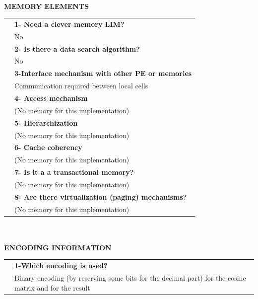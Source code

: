 \newpage{\large \textbf{\qquad }}\vspace{10pt}\\
{\large \textbf{MEMORY ELEMENTS}}\vspace{5pt}\\\begin{tabular}{ p{0.2cm} p{14.5cm}}
	&\textbf{1- Need a clever memory LIM?}\\
	&	No\vspace{7pt}\\
	&\textbf{2- Is there a data search algorithm?}\\
	&	No\vspace{7pt}\\
	&\textbf{	3-Interface mechanism with other PE or memories}\\
	&	Communication required between local cells\vspace{7pt}\\
	&	\textbf{4- Access mechanism}\\
	&	(No memory for this implementation)\vspace{7pt}\\
	&	\textbf{5- Hierarchization} \\
	&	(No memory for this implementation)\vspace{7pt}\\
	&\textbf{	6- Cache coherency} \\
	&	(No memory for this implementation)\vspace{7pt}\\
	&\textbf{	7- Is it a a transactional memory?}\\
	&	(No memory for this implementation)\vspace{7pt}\\
	&\textbf{	8- Are there virtualization (paging) mechanisms?}\\
	&	(No memory for this implementation)\end{tabular}\vspace{14pt}\\
\vspace{10pt}\\
{\large\textbf{ENCODING INFORMATION}}\vspace{10pt}\\
\begin{tabular}{ p{0.2cm} p{14.5cm}}
	&\textbf{1-Which encoding is used?}\\
	&Binary encoding (by reserving some bits for the decimal part) for the cosine matrix and for the result
\end{tabular}

